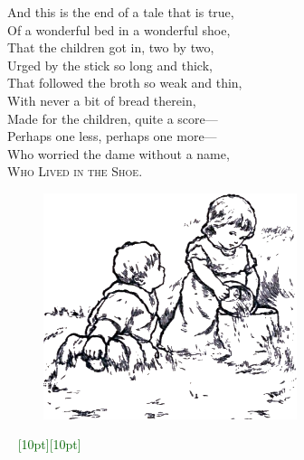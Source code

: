 \documentclass[oneside,12pt,english]{book}
\newcommand{\ornamento}{\vspace{2em}\noindent \textcolor{darkgreen}{\hrulefill~ \raisebox{-2.5pt}[10pt][10pt]{\leafright \decofourleft \decothreeleft  \aldineright \decotwo \floweroneleft \decoone   \floweroneright \decotwo \aldineleft\decothreeright \decofourright \leafleft} ~  \hrulefill \\ \vspace{2em}}}
\begin{document}
\pagebreak
And this is the end of a tale that is true,\\
Of a wonderful bed in a wonderful shoe,\\
That the children got in, two by two,\\
Urged by the stick so long and thick,\\
That followed the broth so weak and thin,\\
With never a bit of bread therein,\\
Made for the children, quite a score---\\
Perhaps one less, perhaps one more---\\
Who worried the dame without a name,\\
\textsc{Who Lived in the Shoe}.

\begin{figure}[H]
\centering
\includegraphics[height=2.6in]{fig-07}
\end{figure}

\ornamento
\end{document}
